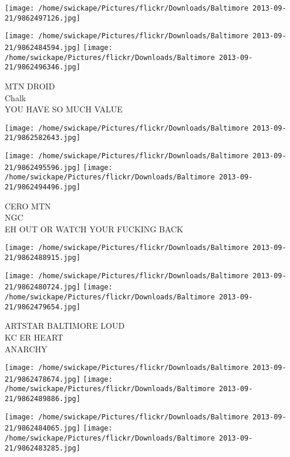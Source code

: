 \documentclass[10pt,letterpaper]{article}
\begin{document}
\texttt{[image: /home/swickape/Pictures/flickr/Downloads/Baltimore 2013-09-21/9862497126.jpg]}

\vspace{0.25in}
\texttt{[image: /home/swickape/Pictures/flickr/Downloads/Baltimore 2013-09-21/9862484594.jpg]}
\texttt{[image: /home/swickape/Pictures/flickr/Downloads/Baltimore 2013-09-21/9862496346.jpg]}

MTN DROID\\
Chalk\\
YOU HAVE SO MUCH VALUE\\
\pagebreak

\texttt{[image: /home/swickape/Pictures/flickr/Downloads/Baltimore 2013-09-21/9862582643.jpg]}

\vspace{0.25in}
\texttt{[image: /home/swickape/Pictures/flickr/Downloads/Baltimore 2013-09-21/9862495596.jpg]}
\texttt{[image: /home/swickape/Pictures/flickr/Downloads/Baltimore 2013-09-21/9862494496.jpg]}

CERO MTN\\
NGC\\
EH OUT OR WATCH YOUR FUCKING BACK\\
\pagebreak

\texttt{[image: /home/swickape/Pictures/flickr/Downloads/Baltimore 2013-09-21/9862488915.jpg]}

\vspace{0.25in}
\texttt{[image: /home/swickape/Pictures/flickr/Downloads/Baltimore 2013-09-21/9862480724.jpg]}
\texttt{[image: /home/swickape/Pictures/flickr/Downloads/Baltimore 2013-09-21/9862479654.jpg]}

ARTSTAR BALTIMORE LOUD\\
KC ER HEART\\
ANARCHY\\
\pagebreak

\texttt{[image: /home/swickape/Pictures/flickr/Downloads/Baltimore 2013-09-21/9862478674.jpg]}
\texttt{[image: /home/swickape/Pictures/flickr/Downloads/Baltimore 2013-09-21/9862489886.jpg]}

\texttt{[image: /home/swickape/Pictures/flickr/Downloads/Baltimore 2013-09-21/9862484065.jpg]}
\texttt{[image: /home/swickape/Pictures/flickr/Downloads/Baltimore 2013-09-21/9862483285.jpg]}
\end{document}
